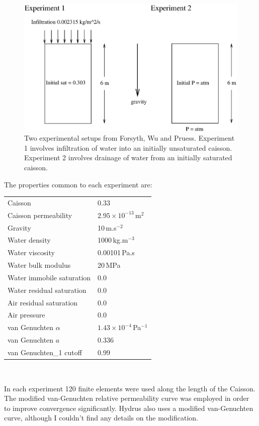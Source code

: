 \documentclass[]{scrreprt}
\begin{document}
\begin{figure}[htb]
\begin{center}
\includegraphics[width=12cm]{rd_setup.eps}
\caption{Two experimental setups from Forsyth, Wu and Pruess.
  Experiment 1 involves infiltration of water into an initially
  unsaturated caisson.  Experiment 2 involves drainage of water from
  an initially saturated caisson.}
\label{rd_setup.fig}
\end{center}
\end{figure}

The properties common to each experiment
are:
\begin{center}
\begin{tabular}{|ll|}
\hline
Caisson & 0.33 \\
Caisson permeability & $2.95\times 10^{-13}$\,m$^{2}$ \\
\hline
Gravity & 10\,m.s$^{-2}$ \\
\hline
Water density & 1000\,kg.m$^{-3}$ \\
Water viscosity & 0.00101\,Pa.s \\
Water bulk modulus & 20\,MPa \\
Water immobile saturation & 0.0 \\
Water residual saturation & 0.0 \\
Air residual saturation & 0.0 \\
Air pressure & 0.0 \\
\hline
van Genuchten $\alpha$ & $1.43\times 10^{-4}$\,Pa$^{-1}$ \\
van Genuchten $a$ & 0.336 \\
van Genuchten\_1 cutoff & 0.99 \\
\hline
\end{tabular} \\
\end{center}
In each experiment 120 finite elements were used along the length of
the Caisson.  The modified van-Genuchten relative permeability curve
was employed in order to improve convergence significantly.  Hydrus
also uses a modified van-Genuchten curve, although I couldn't find any
details on the modification.
\end{document}
